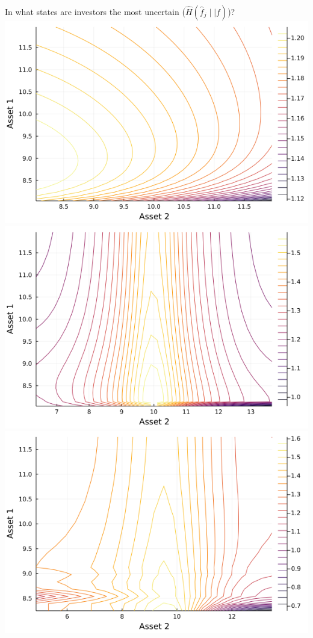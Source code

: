 \documentclass[
  ignorenonframetext,
]{beamer}
\begin{document}
\begin{frame}{In what states are investors the most uncertain
(\(\hat H(\hat f_j \mid\mid f)\))?}
\protect\hypertarget{in-what-states-are-investors-the-most-uncertain-hat-hhat-f_j-midmid-f}{}
\includegraphics[width=0.4\paperheight]{complexity_files/figure-beamer/unnamed-chunk-20-1}
\includegraphics[width=0.4\paperheight]{complexity_files/figure-beamer/unnamed-chunk-20-2}
\includegraphics[width=0.4\paperheight]{complexity_files/figure-beamer/unnamed-chunk-20-3}

\end{frame}
\end{document}
